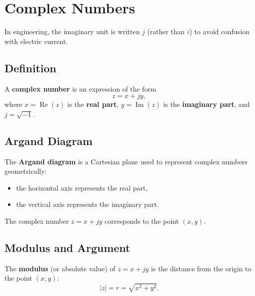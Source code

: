 \chapter{Complex Numbers}

\begin{remark}
In engineering, the imaginary unit is written $j$ (rather than $i$) to avoid
confusion with electric current.
\end{remark}

\section{Definition}

\begin{definition}
A \textbf{complex number} is an expression of the form
\[
  z = x + jy,
\]
where $x = \operatorname{Re}(z)$ is the \textbf{real part}, $y = \operatorname{Im}(z)$ is the
\textbf{imaginary part}, and $j = \sqrt{-1}$.
\end{definition}

\section{Argand Diagram}

\begin{definition}
The \textbf{Argand diagram} is a Cartesian plane used to represent complex numbers
geometrically:
\begin{itemize}
  \item the horizontal axis represents the real part,
  \item the vertical axis represents the imaginary part.
\end{itemize}
The complex number $z = x + jy$ corresponds to the point $(x, y)$.
\end{definition}

\section{Modulus and Argument}

\begin{definition}[Modulus]
The \textbf{modulus} (or absolute value) of $z = x + jy$ is the distance from the
origin to the point $(x,y)$:
\[
  |z| = r = \sqrt{x^2 + y^2}.
\]
\end{definition}

